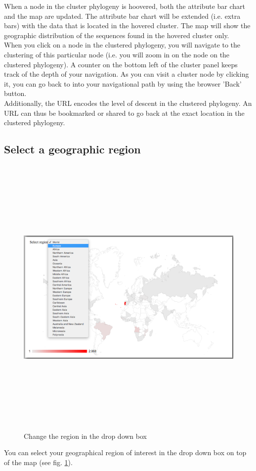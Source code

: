 \documentclass[a4paper, 11pt]{article} %
\begin{document}
When a node in the cluster phylogeny is hoovered, both the attribute bar chart and the map are updated. The attribute bar chart will be extended (i.e. extra bars) with the data that is located in the hovered cluster. The map will show the geographic distribution of the sequences found in the hovered cluster only.
\\
When you click on a node in the clustered phylogeny, you will navigate to the clustering of this particular node (i.e. you will zoom in on the node on the clustered phylogeny).
A counter on the bottom left of the cluster panel keeps track of the depth of your navigation. As you can visit a cluster node by clicking it, you can go back to into your navigational path by using the browser 'Back' button.
\\
Additionally, the URL encodes the level of descent in the clustered phylogeny. An URL can thus be bookmarked or shared to go back at the exact location in the clustered phylogeny.\\ 

\subsection{Select a geographic region}
\begin{figure}[H]
\centering
\includegraphics[width=400pt, height=400pt, keepaspectratio=true]{images/change_country.PNG}
\caption{Change the region in the drop down box}
\label{fig:change_region}
\end{figure}
You can select your geographical region of interest in the drop down box on top of the map (see fig. \ref{fig:change_region}). 
\end{document}
